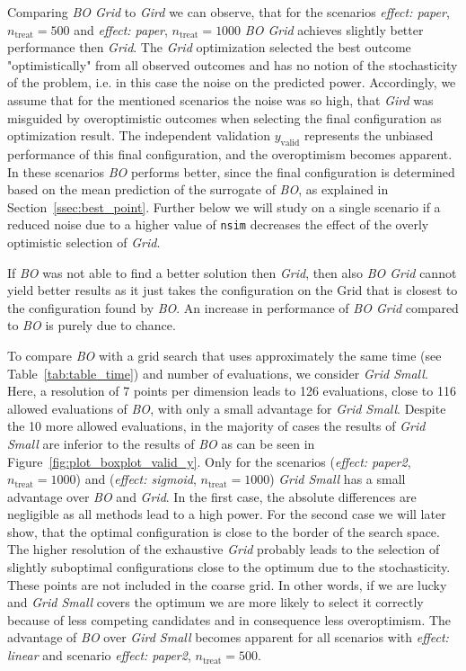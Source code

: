 \documentclass[bimj,fleqn]{w-art}
\theoremstyle{plain}
\theoremstyle{definition}
\begin{document}
Comparing \emph{BO Grid} to \emph{Gird} we can observe, that for the scenarios \emph{effect: paper}, $n_{\text{treat}} = 500$ and \emph{effect: paper}, $n_{\text{treat}} = 1000$ \emph{BO Grid} achieves slightly better performance then \emph{Grid}.
The \emph{Grid} optimization selected the best outcome "optimistically" from all observed outcomes and has no notion of the stochasticity of the problem, i.e. in this case the noise on the predicted power. 
Accordingly, we assume that for the mentioned scenarios the noise was so high, that \emph{Gird} was misguided by overoptimistic outcomes when selecting the final configuration as optimization result.
The independent validation $y_{\text{valid}}$ represents the unbiased performance of this final configuration, and the overoptimism becomes apparent.
In these scenarios \emph{BO} performs better, since the final configuration is determined based on the mean prediction of the surrogate of \emph{BO}, as explained in Section~\ref{ssec:best_point}.
Further below we will study on a single scenario if a reduced noise due to a higher value of \texttt{nsim} decreases the effect of the overly optimistic selection of \emph{Grid}.

If \emph{BO} was not able to find a better solution then \emph{Grid}, then also \emph{BO Grid} cannot yield better results as it just takes the configuration on the Grid that is closest to the configuration found by \emph{BO}.
An increase in performance of \emph{BO Grid} compared to \emph{BO} is purely due to chance.

To compare \emph{BO} with a grid search that uses approximately the same time (see Table~\ref{tab:table_time}) and number of evaluations, we consider \emph{Grid Small}.
Here, a resolution of 7 points per dimension leads to 126 evaluations, close to 116 allowed evaluations of \emph{BO}, with only a small advantage for \emph{Grid Small}.
Despite the 10 more allowed evaluations, in the majority of cases the results of \emph{Grid Small} are inferior to the results of \emph{BO} as can be seen in Figure~\ref{fig:plot_boxplot_valid_y}.
Only for the scenarios (\emph{effect: paper2}, $n_{\text{treat}} = 1000$) and (\emph{effect: sigmoid}, $n_{\text{treat}} = 1000$) \emph{Grid Small} has a small advantage over \emph{BO} and \emph{Grid}.
In the first case, the absolute differences are negligible as all methods lead to a high power.
For the second case we will later show, that the optimal configuration is close to the border of the search space.
The higher resolution of the exhaustive \emph{Grid} probably leads to the selection of slightly suboptimal configurations close to the optimum due to the stochasticity.
These points are not included in the coarse grid.
In other words, if we are lucky and \emph{Grid Small} covers the optimum we are more likely to select it correctly because of less competing candidates and in consequence less overoptimism.
The advantage of \emph{BO} over \emph{Gird Small} becomes apparent for all scenarios with \emph{effect: linear} and scenario \emph{effect: paper2}, $n_{\text{treat}} = 500$.
\end{document}
